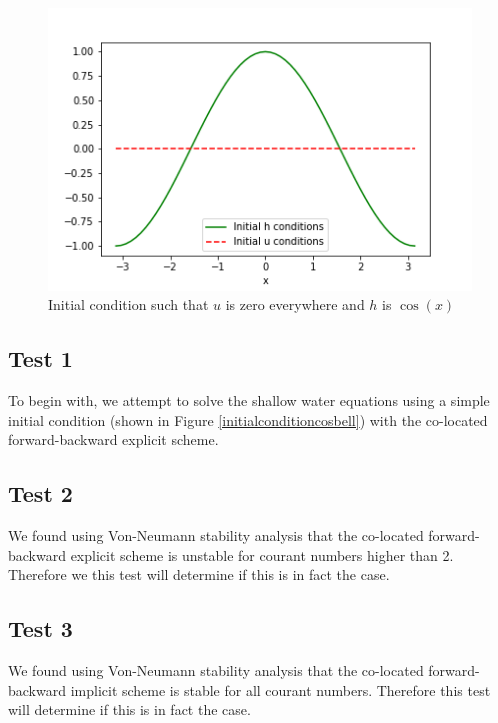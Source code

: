 \documentclass[a4paper,12pt, notitlepage]{article}
\begin{document}
\begin{figure}
\begin{minipage}{.5\textwidth}
	\end{minipage}
	\begin{center}
		\begin{minipage}{.5\textwidth}
			\ContinuedFloat
			\captionsetup{width=0.9\textwidth}
			\captionsetup{justification=centering}
			\includegraphics[width=\textwidth]{initial_condition_cos.png}
			\caption{\label{initialconditioncos}Initial condition such that $u$ is zero everywhere and $h$ is $\cos(x)$}
		\end{minipage}
	\end{center}
\end{figure}

\subsection{Test 1}
To begin with, we attempt to solve the shallow water equations using a simple initial condition (shown in Figure \ref{initialconditioncosbell}) with the co-located forward-backward explicit scheme.

\subsection{Test 2}
We found using Von-Neumann stability analysis that the co-located forward-backward explicit scheme is unstable for courant numbers higher than 2. Therefore we this test will determine if this is in fact the case.

\subsection{Test 3}
We found using Von-Neumann stability analysis that the co-located forward-backward implicit scheme is stable for all courant numbers. Therefore this test will determine if this is in fact the case.
\end{document}
